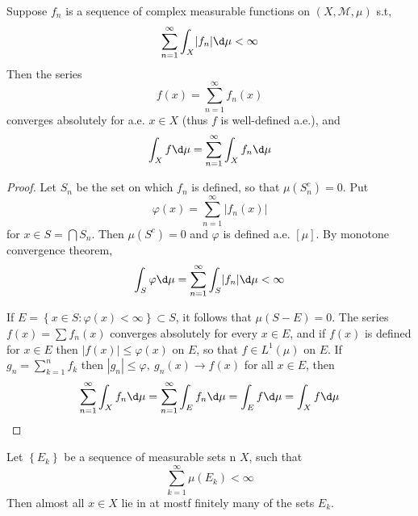 \documentclass[12pt, a4paper, oneside]{book}
\begin{document}
\begin{theorem}
    Suppose ${f_n}$ is a sequence of complex measurable functions on $\left(X,\mathcal{M},\mu\right)$ s.t,
    \begin{equation*}
        \sum_{n=1}^\infty\int_X\lvert f_n\rvert \d \mu < \infty
    \end{equation*}
    Then the series
    \begin{equation*}
        f(x)=\sum_{n=1}^{\infty}f_n(x)
    \end{equation*}
    converges absolutely for a.e. $x\in X$ (thus $f$ is well-defined a.e.), and
    \begin{equation*}
        \int_X f\d \mu=\sum_{n=1}^\infty\int_X f_n \d \mu
    \end{equation*}
    \begin{proof}
        Let $S_n$ be the set on which $f_n$ is defined, so that $\mu(S_n^c)=0.$ Put
        $$\varphi(x)=\sum_{n=1}^\infty \lvert f_n(x)\rvert$$
        for $x\in S=\bigcap S_{n}$. Then $\mu(S^c)=0$ and $\varphi$ is defined a.e. $[\mu]$. By monotone convergence theorem,
        \begin{equation*}
            \int_S\varphi\d \mu =
            \sum_{n=1}^\infty\int_S \lvert f_n\rvert \d \mu < \infty
        \end{equation*}

        If $E=\left\{x\in S:\varphi(x)<\infty\right\} \subset S$, it follows that $\mu(S-E)=0$.
        The series $f(x)=\sum f_n(x)$ converges absolutely for every $x\in E$, and if $f(x)$ is defined for $x\in E$ then $\left|f(x)\right|\leq \varphi(x)$ on $E$, so that $f\in L^1(\mu)$ on $E$. If $g_n=\sum\limits_{k=1}^n f_k$ then $\left|g_n\right|\leq\varphi,\:g_n(x)\to f(x)$ for all $x\in E$, then
        \begin{equation*}
            \sum_{n=1}^\infty\int_X f_n \d \mu
            =\sum_{n=1}^\infty\int_E f_n \d \mu
            =\int_E f\d \mu
            =\int_X f\d \mu
        \end{equation*}
    \end{proof}
\end{theorem}
\begin{corollary}
    Let $\left\{E_k\right\}$ be a sequence of measurable sets n $X$, such that
    $$\sum_{k=1}^{\infty}\mu(E_{k})<\infty$$
    Then almost all $ x\in X$ lie in at mostf finitely many of the sets $E_k$.
\end{corollary}
\end{document}
